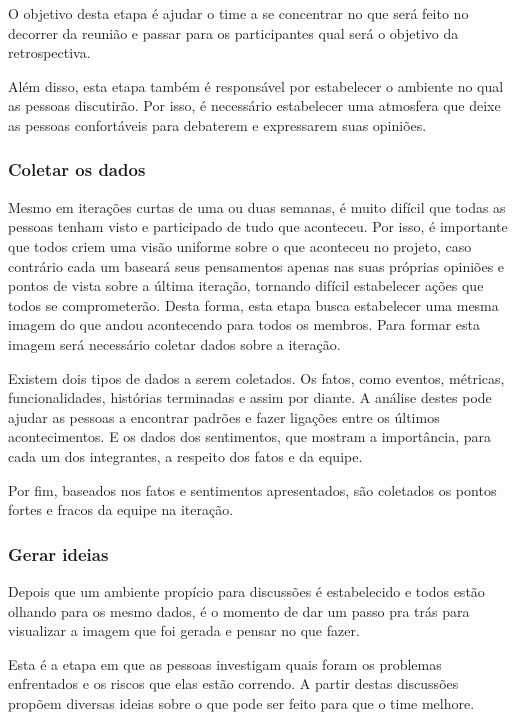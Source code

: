 O objetivo desta etapa é ajudar o time a se concentrar no que será feito no decorrer da reunião e passar para os participantes qual será o objetivo da retrospectiva.

Além disso, esta etapa também é responsável por estabelecer o ambiente no qual as pessoas discutirão. Por isso, é necessário estabelecer uma atmosfera que deixe as pessoas confortáveis para debaterem e expressarem suas opiniões.

\subsubsection*{Coletar os dados}

Mesmo em iterações curtas de uma ou duas semanas, é muito difícil que todas as pessoas tenham visto e participado de tudo que aconteceu. Por isso, é importante que todos criem uma visão uniforme sobre o que aconteceu no projeto, caso contrário cada um baseará seus pensamentos apenas nas suas próprias opiniões e pontos de vista sobre a última iteração, tornando difícil estabelecer ações que todos se comprometerão. Desta forma, esta etapa busca estabelecer uma mesma imagem do que andou acontecendo para todos os membros. Para formar esta imagem será necessário coletar dados sobre a iteração.

Existem dois tipos de dados a serem coletados. Os fatos, como eventos, métricas, funcionalidades, histórias terminadas e assim por diante. A análise destes pode ajudar as pessoas a encontrar padrões e fazer ligações entre os últimos acontecimentos. E os dados dos sentimentos, que mostram a importância, para cada um dos integrantes, a respeito dos fatos e da equipe. 

Por fim, baseados nos fatos e sentimentos apresentados, são coletados os pontos fortes e fracos da equipe na iteração.

\subsubsection*{Gerar ideias}

Depois que um ambiente propício para discussões é estabelecido e todos estão olhando para os mesmo dados, é o momento de dar um passo pra trás para visualizar a imagem que foi gerada e pensar no que fazer. 

Esta é a etapa em que as pessoas investigam quais foram os problemas enfrentados e os riscos que elas estão correndo. A partir destas discussões propõem diversas ideias sobre o que pode ser feito para que o time melhore.

